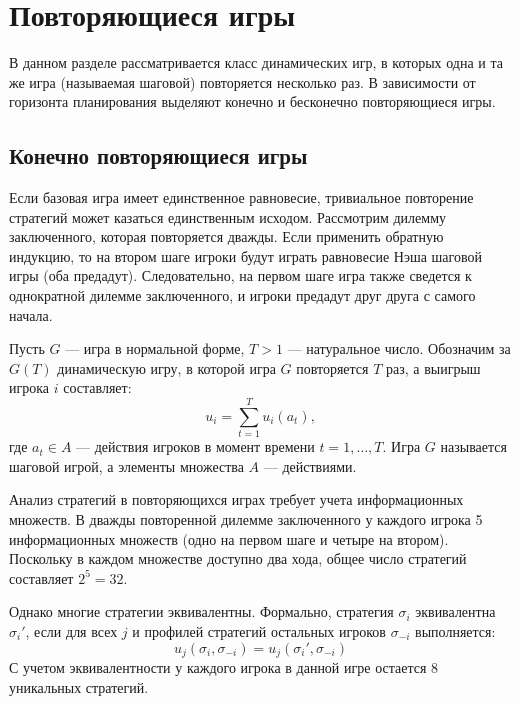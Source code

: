 \section{Повторяющиеся игры}

В данном разделе рассматривается класс динамических игр, в которых одна и та же игра (называемая шаговой) повторяется несколько раз. В зависимости от горизонта планирования выделяют конечно и бесконечно повторяющиеся игры.

\subsection{Конечно повторяющиеся игры}

Если базовая игра имеет единственное равновесие, тривиальное повторение стратегий может казаться единственным исходом. Рассмотрим дилемму заключенного, которая повторяется дважды. Если применить обратную индукцию, то на втором шаге игроки будут играть равновесие Нэша шаговой игры (оба предадут). Следовательно, на первом шаге игра также сведется к однократной дилемме заключенного, и игроки предадут друг друга с самого начала.

\begin{definition}
Пусть $G$ — игра в нормальной форме, $T > 1$ — натуральное число. Обозначим за $G(T)$ динамическую игру, в которой игра $G$ повторяется $T$ раз, а выигрыш игрока $i$ составляет:
\begin{equation}
    u_i = \sum_{t=1}^T u_i(a_t),
\end{equation}
где $a_t \in A$ — действия игроков в момент времени $t = 1, \dots, T$. Игра $G$ называется шаговой игрой, а элементы множества $A$ — действиями.
\end{definition}

Анализ стратегий в повторяющихся играх требует учета информационных множеств. В дважды повторенной дилемме заключенного у каждого игрока 5 информационных множеств (одно на первом шаге и четыре на втором). Поскольку в каждом множестве доступно два хода, общее число стратегий составляет $2^5 = 32$.

Однако многие стратегии эквивалентны. Формально, стратегия $\sigma_i$ эквивалентна $\sigma_i'$, если для всех $j$ и профилей стратегий остальных игроков $\sigma_{-i}$ выполняется:
\begin{equation}
    u_j(\sigma_i, \sigma_{-i}) = u_j(\sigma_i', \sigma_{-i})
\end{equation}
С учетом эквивалентности у каждого игрока в данной игре остается 8 уникальных стратегий.

